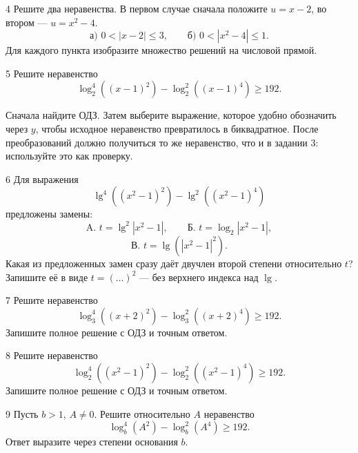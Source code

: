 \newpage
\begin{homeworktask}{4}
  Решите два неравенства. В первом случае сначала положите \(u=x-2\),
  во втором --- \(u=x^2-4\).
  \[
    \text{а) }0<|x-2|\le3,
    \qquad
    \text{б) }0<|x^2-4|\le1.
  \]
  Для каждого пункта изобразите множество решений на числовой прямой.
  \answerspace{62mm}
\end{homeworktask}

\newpage
\begin{homeworktask}{5}
  Решите неравенство
  \[
    \log_2^4((x-1)^2)-\log_2^2((x-1)^4)\ge192.
  \]

  \structuredsolutionmap

  \begin{hintbox}
    Сначала найдите ОДЗ. Затем выберите выражение, которое удобно обозначить
    через \(y\), чтобы исходное неравенство превратилось в биквадратное.
    После преобразований должно получиться то же неравенство, что и в
    задании 3: используйте это как проверку.
  \end{hintbox}
\end{homeworktask}

\newpage
\begin{homeworktask}{6}
  Для выражения
  \[
    \lg^4((x^2-1)^2)-\lg^2((x^2-1)^4)
  \]
  предложены замены:
  \[
    \text{A. }t=\lg^2|x^2-1|,
    \qquad
    \text{Б. }t=\log_2|x^2-1|,
  \]
  \[
    \text{В. }t=\lg(|x^2-1|^2).
  \]
 Какая из предложенных замен сразу даёт двучлен второй степени
относительно \(t\)? Запишите её в виде \(t=(\ldots)^2\) ---
без верхнего индекса над \(\lg\).
  \answerspace{10mm}
\end{homeworktask}


\begin{homeworktask}{7}
  Решите неравенство
  \[
    \log_3^4((x+2)^2)-\log_3^2((x+2)^4)\ge192.
  \]
  Запишите полное решение с ОДЗ и точным ответом.
  \reducedsolutionmap

\end{homeworktask}

\newpage
\begin{homeworktask}{8}
  Решите неравенство
  \[
    \log_2^4((x^2-1)^2)-\log_2^2((x^2-1)^4)\ge192.
  \]
  Запишите полное решение с ОДЗ и точным ответом.
  \answerspace{85mm}
\end{homeworktask}

\newpage
\begin{homeworktask}{9}
  Пусть \(b>1\), \(A\ne0\). Решите относительно \(A\) неравенство
  \[
    \log_b^4(A^2)-\log_b^2(A^4)\ge192.
  \]
  Ответ выразите через степени основания \(b\).
  \answerspace{48mm}
  \shortanswerline
\end{homeworktask}

